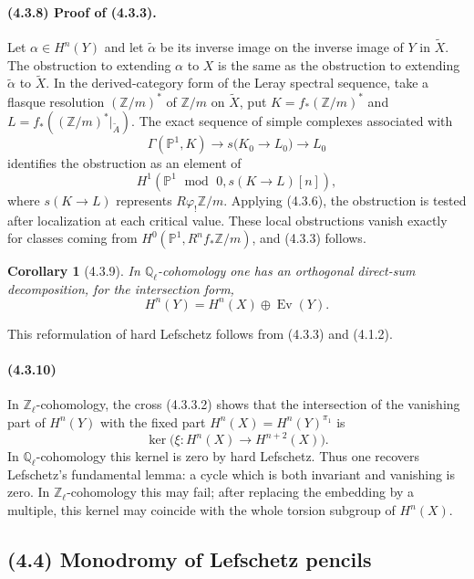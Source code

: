 \documentclass[11pt]{article}
\newtheorem{corollary}{Corollary}
\theoremstyle{remark}
\begin{document}
\paragraph{(4.3.8) Proof of (4.3.3).}
Let $\alpha\in H^n(Y)$ and let $\tilde\alpha$ be its inverse image on the inverse image of $Y$ in $\widetilde X$. The obstruction to extending $\alpha$ to $X$ is the same as the obstruction to extending $\tilde\alpha$ to $\widetilde X$. In the derived-category form of the Leray spectral sequence, take a flasque resolution $(\mathbb Z/m)^*$ of $\mathbb Z/m$ on $\widetilde X$, put $K=f_*(\mathbb Z/m)^*$ and $L=f_*((\mathbb Z/m)^*|_{\widetilde A})$. The exact sequence of simple complexes associated with
\[
\Gamma(\mathbb P^1,K)\to s\bigl(K_0\to L_0\bigr)\to L_0
\]
identifies the obstruction as an element of
\[
H^1(\mathbb P^1\operatorname{\ mod\ }0,s(K\to L)[n]),
\]
where $s(K\to L)$ represents $R\varphi_!\mathbb Z/m$. Applying (4.3.6), the obstruction is tested after localization at each critical value. These local obstructions vanish exactly for classes coming from $H^0(\mathbb P^1,R^n f_*\mathbb Z/m)$, and (4.3.3) follows.

\begin{corollary}[4.3.9]
In $\mathbb Q_\ell$-cohomology one has an orthogonal direct-sum decomposition, for the intersection form,
\[
H^n(Y)=H^n(X)\oplus \operatorname{Ev}(Y).
\]
\end{corollary}

This reformulation of hard Lefschetz follows from (4.3.3) and (4.1.2).

\paragraph{(4.3.10)}
In $\mathbb Z_\ell$-cohomology, the cross (4.3.3.2) shows that the intersection of the vanishing part of $H^n(Y)$ with the fixed part $H^n(X)=H^n(Y)^{\pi_1}$ is
\[
\ker\bigl(\xi:H^n(X)\to H^{n+2}(X)\bigr).
\]
In $\mathbb Q_\ell$-cohomology this kernel is zero by hard Lefschetz. Thus one recovers Lefschetz's fundamental lemma: a cycle which is both invariant and vanishing is zero. In $\mathbb Z_\ell$-cohomology this may fail; after replacing the embedding by a multiple, this kernel may coincide with the whole torsion subgroup of $H^n(X)$.

\subsection*{(4.4) Monodromy of Lefschetz pencils}
\end{document}
